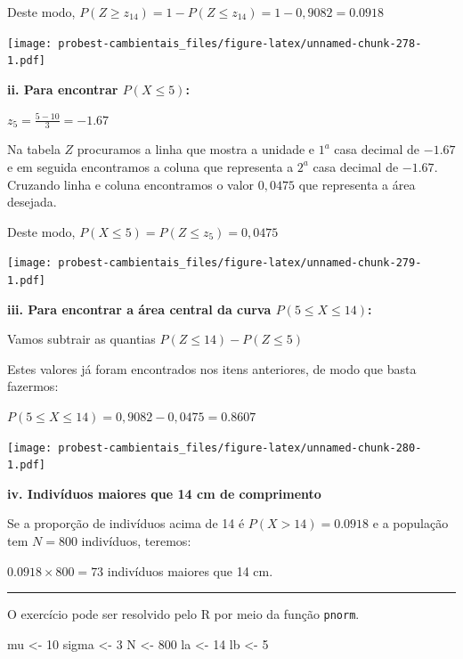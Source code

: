 \documentclass[
]{book}
\newenvironment{Shaded}{\begin{snugshade}}{\end{snugshade}}
\newcommand{\DecValTok}[1]{\textcolor[rgb]{0.00,0.00,0.81}{#1}}
\newcommand{\NormalTok}[1]{#1}
\newcommand{\OtherTok}[1]{\textcolor[rgb]{0.56,0.35,0.01}{#1}}
\begin{document}
Deste modo, \(P(Z \ge z_{14}) = 1 - P(Z \le z_{14}) = 1 - 0,9082 = 0.0918\)

\texttt{[image: probest-cambientais\_files/figure-latex/unnamed-chunk-278-1.pdf]}

\textbf{ii. Para encontrar \(P(X \le 5)\):}

\(z_{5} = \frac{5 - 10}{3} = -1.67\)

Na tabela \(Z\) procuramos a linha que mostra a unidade e \(1^a\) casa decimal de \(-1.67\) e em seguida encontramos a coluna que representa a \(2^a\) casa decimal de \(-1.67\). Cruzando linha e coluna encontramos o valor \(0,0475\) que representa a área desejada.

Deste modo, \(P(X \le 5) = P(Z \le z_{5}) = 0,0475\)

\texttt{[image: probest-cambientais\_files/figure-latex/unnamed-chunk-279-1.pdf]}

\textbf{iii. Para encontrar a área central da curva \(P(5 \le X \le 14)\):}

Vamos subtrair as quantias \(P(Z \le 14) - P(Z \le 5)\)

Estes valores já foram encontrados nos itens anteriores, de modo que basta fazermos:

\(P(5 \le X \le 14) = 0,9082 - 0,0475 = 0.8607\)

\texttt{[image: probest-cambientais\_files/figure-latex/unnamed-chunk-280-1.pdf]}

\textbf{iv. Indivíduos maiores que 14 cm de comprimento}

Se a proporção de indivíduos acima de 14 é \(P(X > 14) = 0.0918\) e a população tem \(N = 800\) indivíduos, teremos:

\(0.0918 \times 800 = 73\) indivíduos maiores que 14 cm.

\begin{center}\rule{0.5\linewidth}{0.5pt}\end{center}

O exercício pode ser resolvido pelo R por meio da função \texttt{pnorm}.

\begin{Shaded}
\begin{Highlighting}[]
\NormalTok{mu }\OtherTok{\textless{}{-}} \DecValTok{10}
\NormalTok{sigma }\OtherTok{\textless{}{-}} \DecValTok{3}
\NormalTok{N }\OtherTok{\textless{}{-}} \DecValTok{800}
\NormalTok{la }\OtherTok{\textless{}{-}} \DecValTok{14}
\NormalTok{lb }\OtherTok{\textless{}{-}} \DecValTok{5}
\end{Highlighting}
\end{Shaded}
\end{document}
